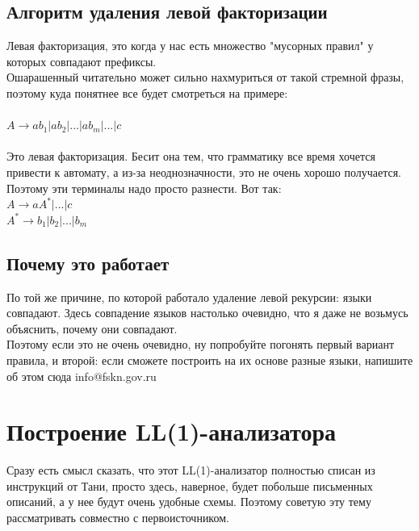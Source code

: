 \documentclass[14pt]{extreport}
\begin{document}
	\section{Алгоритм удаления левой факторизации}
	Левая факторизация, это когда у нас есть множество "мусорных правил" у которых
	совпадают префиксы.\\
	Ошарашенный читательно может сильно нахмуриться от такой стремной фразы, поэтому
	куда понятнее все будет смотреться на примере:\\\\
	$A \to ab_1|ab_2|...|ab_m|...|c $\\\\
	Это левая факторизация. Бесит она тем, что грамматику все время хочется привести к
	автомату, а из-за неоднозначности, это не очень хорошо получается.\\
	Поэтому эти терминалы надо просто разнести. Вот так:\\
	$A \to aA^*|...|c $\\
	$A^* \to b_1|b_2|...|b_m $\\
	\section{Почему это работает}
	По той же причине, по которой работало удаление левой рекурсии: языки совпадают.
	Здесь совпадение языков настолько очевидно, что я даже не возьмусь объяснить, почему
	они совпадают.\\
	Поэтому если это не очень очевидно, ну попробуйте погонять первый вариант правила, и
	второй: если сможете построить на их основе разные языки, напишите об этом сюда
	info@fskn.gov.ru
	\chapter{Построение LL(1)-анализатора}
	Сразу есть смысл сказать, что этот LL(1)-анализатор полностью списан из инструкций
	от Тани, просто здесь, наверное, будет побольше письменных описаний, а у нее будут
	очень удобные схемы. Поэтому советую эту тему рассматривать совместно с первоисточником.
	\\
\end{document}
